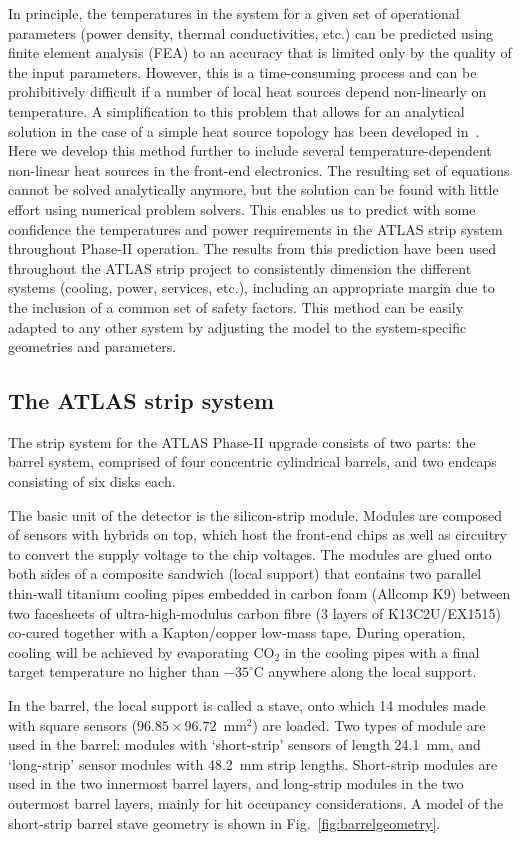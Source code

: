 In principle, the temperatures in the system for a given set of operational parameters (power density, thermal conductivities, etc.) can be predicted using finite element analysis (FEA) to an accuracy that is limited only by the quality of the input parameters. However, this is a time-consuming process and can be prohibitively difficult if a number of local heat sources depend non-linearly on temperature. A simplification to this problem that allows for an analytical solution in the case of a simple heat source topology has been developed in~\cite{Beck:2010zzd}. Here we develop this method further to include several temperature-dependent non-linear heat sources in the front-end electronics. The resulting set of equations cannot be solved analytically anymore, but the solution can be found with little effort using numerical problem solvers. This enables us to predict with some confidence the temperatures and power requirements in the ATLAS strip system throughout Phase-II operation. The results from this prediction have been used throughout the ATLAS strip project to consistently dimension the different systems (cooling, power, services, etc.), including an appropriate margin due to the inclusion of a common set of safety factors. This method can be easily adapted to any other system by adjusting the model to the system-specific geometries and parameters.

\subsection{The ATLAS strip system}
The strip system for the ATLAS Phase-II upgrade consists of two parts: the barrel system, comprised of four concentric cylindrical barrels, and two endcaps consisting of six disks each.

The basic unit of the detector is the silicon-strip module. Modules are composed of sensors with hybrids on top, which host the front-end chips as well as circuitry to convert the supply voltage to the chip voltages. The modules are glued onto both sides of a composite sandwich (local support) that contains two parallel thin-wall titanium cooling pipes embedded in carbon foam (Allcomp K9) between two facesheets of ultra-high-modulus carbon fibre (3 layers of K13C2U/EX1515) co-cured together with a Kapton/copper low-mass tape. During operation, cooling will be achieved by evaporating CO$_2$ in the cooling pipes with a final target temperature no higher than $-35^\circ$C anywhere along the local support.

In the barrel, the local support is called a stave, onto which 14 modules made with square sensors ($96.85\times 96.72$~mm$^2$) are loaded. Two types of module are used in the barrel: modules with `short-strip' sensors of length 24.1~mm, and `long-strip' sensor modules with 48.2~mm strip lengths. Short-strip modules are used in the two innermost barrel layers, and long-strip modules in the two outermost barrel layers, mainly for hit occupancy considerations. A model of the short-strip barrel stave geometry is shown in Fig.~\ref{fig:barrelgeometry}.

